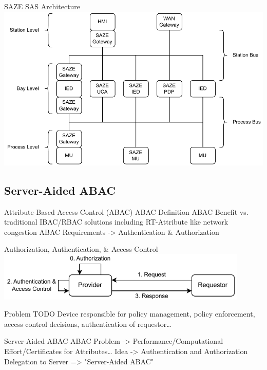 \documentclass[en]{sdqbeamer}
\begin{document}
\begin{frame}{SAZE SAS Architecture}
    \centering
    \includegraphics[height=0.75\textheight]{./figures/saze_architecture.drawio.pdf}
\end{frame}

\subsection{Server-Aided ABAC}
\begin{frame}{Attribute-Based Access Control (ABAC)}
    ABAC Definition
    ABAC Benefit vs. traditional IBAC/RBAC solutions including RT-Attribute like network congestion
    ABAC Requirements -> Authentication \& Authorization
\end{frame}

\begin{frame}{Authorization, Authentication, \& Access Control}
    \centering
	\includegraphics[width=0.9\textwidth]{./figures/access_control_request_traditional.drawio.pdf}
    \begin{redblock}{Problem}
        TODO
        Device responsible for policy management, policy enforcement, access control decisions, authentication of requestor\dots
    \end{redblock}
\end{frame}

\begin{frame}{Server-Aided ABAC}
    ABAC Problem -> Performance/Computational Effort/Certificates for Attributes\dots
    Idea -> Authentication and Authorization Delegation to Server => "Server-Aided ABAC"
\end{frame}
\end{document}
